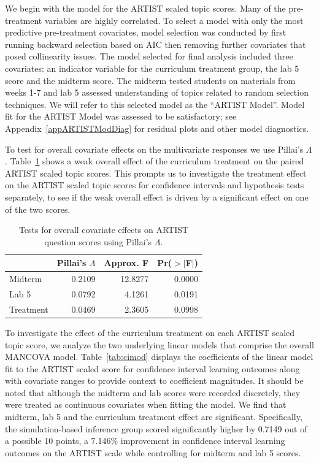 We begin with the model for the ARTIST scaled topic scores.  Many of the pre-treatment variables are highly correlated. To select a model with only the most predictive pre-treatment covariates, model selection was conducted by first running backward selection based on AIC then removing further covariates that posed collinearity issues. The model selected for final analysis included three covariates: an indicator variable for the curriculum treatment group, the lab 5 score and the midterm score.  The midterm tested students on materials from weeks 1-7 and lab 5 assessed understanding of topics related to random selection techniques.  We will refer to this selected model as the ``ARTIST Model''. Model fit for the ARTIST Model was assessed to be satisfactory; see Appendix~\ref{appARTISTModDiag} for residual plots and other model diagnostics.





To test for overall covariate effects on the multivariate responses we use Pillai's $\Lambda$. Table~\ref{tab:overallmod} shows a weak overall effect of the curriculum treatment on the paired ARTIST scaled topic scores.  This prompts us to investigate the treatment effect on the ARTIST scaled topic scores for confidence intervals and hypothesis tests separately, to see if the weak overall effect is driven by a significant effect on one of the two scores.

\begin{table}[hbtp]
\centering
\begin{tabular}{lrrr} \hline
 & Pillai's $\Lambda$ & Approx. F & Pr($>$$|$F$|$)\\ 
 \hline  
Midterm & 0.2109 & 12.8277 &
0.0000\\ 
Lab 5 & 0.0792 & 4.1261 &
0.0191\\ 
Treatment & 0.0469 & 2.3605 &
0.0998\\ 
\hline
\end{tabular}
\caption{Tests for overall covariate effects on ARTIST question scores using Pillai's $\Lambda$.}
\label{tab:overallmod}
\end{table}

To investigate the effect of the curriculum treatment on each ARTIST scaled topic score, we analyze the two underlying linear models that comprise the overall MANCOVA model. Table~\ref{tab:cimod} displays the coefficients of the linear model fit to the ARTIST scaled score for confidence interval learning outcomes along with covariate ranges to provide context to coefficient magnitudes. It should be noted that although the midterm and lab scores were recorded discretely, they were treated as continuous covariates when fitting the model. We find that midterm, lab 5 and the curriculum treatment effect are significant. Specifically, the simulation-based inference group scored significantly higher by 0.7149 out of a possible 10 points, a 7.146\% improvement in confidence interval learning outcomes on the ARTIST scale while controlling for midterm and lab 5 scores.\\


